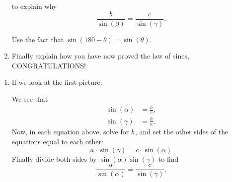 \documentclass[noauthor,nooutcomes,12pt,handout,hints]{ximera}
\begin{document}
\begin{question}
\begin{enumerate}
\begin{center}
  \end{center}
  to explain why
  \[
  \frac{b}{\sin(\beta)} = \frac{c}{\sin(\gamma)}.
  \]
  \begin{hint}
    Use the fact that $\sin(180-\theta) = \sin(\theta)$.
  \end{hint}
\item Finally explain how you have now proved the law of sines, CONGRATULATIONS!
  \end{enumerate}
  \begin{freeResponse}
    \begin{enumerate}
    \item If we look at the first picture:
      \begin{center}
    \end{center}
    We see that
    \begin{align*}
      \sin(\alpha) &= \frac{h}{c},\\
      \sin(\gamma) &= \frac{h}{a}.
    \end{align*}
    Now, in each equation above, solve for $h$, and set the other
    sides of the equations equal to each other:
    \[
    a\cdot \sin(\gamma)=c\cdot \sin(\alpha)
    \]
    Finally divide both sides by $\sin(\alpha)\sin(\gamma)$ to find
    \[
    \frac{a}{\sin(\alpha)} = \frac{c}{\sin(\gamma)}.
    \]


\end{enumerate}
\end{freeResponse}
\end{question}
\end{document}
